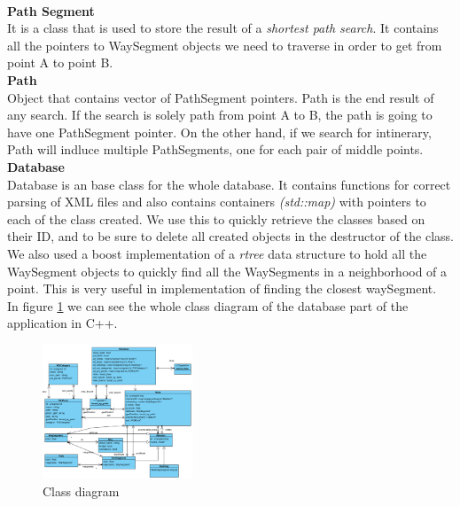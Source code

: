 \documentclass[reqno,openany,12pt]{amsbook}
\theoremstyle{definition}
\theoremstyle{remark}
\begin{document}
\\
\textbf{Path Segment}\\
It is a class that is used to store the result of a \textit{shortest path search}. It contains all the pointers to WaySegment objects we need to traverse in order to get from point A to point B. \\
\textbf{Path}\\
Object that contains vector of PathSegment pointers. Path is the end result of any search. If the search is solely path from point A to B, the path is going to have one PathSegment pointer. On the other hand, if we search for intinerary, Path will indluce multiple PathSegments, one for each pair of middle points.
\\
\textbf{Database}\\
Database is an base class for the whole database. It contains functions for correct parsing of XML files and also contains containers \textit{(std::map)} with pointers to each of the class created. We use this to quickly retrieve the classes based on their ID, and to be sure to delete all created objects in the destructor of the class. We also used a boost implementation of a \textit{rtree} data structure to hold all the WaySegment objects to quickly find all the WaySegments in a neighborhood of a point. This is very useful in implementation of finding the closest waySegment.
\\
In figure \ref{fig:db_class} we can see the whole class diagram of the database part of the application in C++.
 \begin{figure}[h]
 \centering
 \includegraphics[height=4cm]{../photos/Class_Diagram.png}
 \caption{Class diagram}
 \label{fig:db_class}
 \end{figure}
\end{document}
